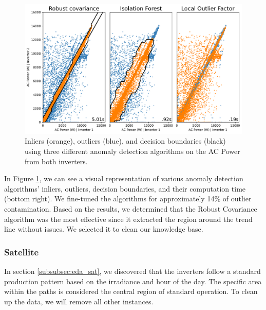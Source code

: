 \begin{figure}[h!]
    \centering
    \includegraphics[width=\textwidth]{figures/chapter5/cleaning/20_cleaning_power.pdf}
    \caption{Inliers (orange), outliers (blue), and decision boundaries (black) using three different anomaly detection algorithms on the AC Power from both inverters.}
    \label{fig:clean_power}
\end{figure}

In Figure \ref{fig:clean_power}, we can see a visual representation of various anomaly detection algorithms' inliers, outliers, decision boundaries, and their computation time (bottom right). We fine-tuned the algorithms for approximately 14\% of outlier contamination. Based on the results, we determined that the Robust Covariance algorithm was the most effective since it extracted the region around the trend line without issues. We selected it to clean our knowledge base.

\subsubsection{Satellite}

In section \ref{subsubsec:eda_sat}, we discovered that the inverters follow a standard production pattern based on the irradiance and hour of the day. The specific area within the paths is considered the central region of standard operation. To clean up the data, we will remove all other instances.

